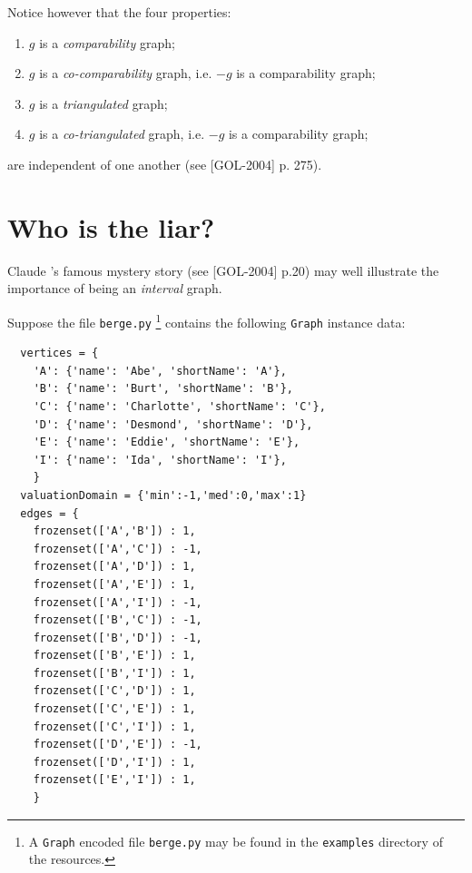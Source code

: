 Notice however that the four properties:
\begin{enumerate}
\item $g$ is a \emph{comparability} graph;
\item $g$ is a \emph{co-comparability} graph, i.e. $-g$ is a comparability graph;
\item $g$ is a \emph{triangulated} graph;
\item $g$ is a \emph{co-triangulated} graph, i.e. $-g$ is a comparability graph;
\end{enumerate}
are independent of one another (see [GOL-2004] p. 275).

\section{Who is the liar?}
\label{sec:25.2}


Claude \Berge's famous mystery story (see [GOL-2004] p.20) may well illustrate the importance of being an \emph{interval} graph.

Suppose the file \texttt{berge.py} \footnote{A \texttt{Graph} encoded file \texttt{berge.py} may be found in the \texttt{examples} directory of the \Digraph resources.} contains the following \texttt{Graph} instance data:
\begin{lstlisting}
  vertices = {
    'A': {'name': 'Abe', 'shortName': 'A'},
    'B': {'name': 'Burt', 'shortName': 'B'},
    'C': {'name': 'Charlotte', 'shortName': 'C'},
    'D': {'name': 'Desmond', 'shortName': 'D'},
    'E': {'name': 'Eddie', 'shortName': 'E'},
    'I': {'name': 'Ida', 'shortName': 'I'},
    }
  valuationDomain = {'min':-1,'med':0,'max':1}
  edges = {
    frozenset(['A','B']) : 1, 
    frozenset(['A','C']) : -1, 
    frozenset(['A','D']) : 1, 
    frozenset(['A','E']) : 1, 
    frozenset(['A','I']) : -1, 
    frozenset(['B','C']) : -1, 
    frozenset(['B','D']) : -1, 
    frozenset(['B','E']) : 1, 
    frozenset(['B','I']) : 1, 
    frozenset(['C','D']) : 1, 
    frozenset(['C','E']) : 1, 
    frozenset(['C','I']) : 1, 
    frozenset(['D','E']) : -1, 
    frozenset(['D','I']) : 1, 
    frozenset(['E','I']) : 1, 
    }
\end{lstlisting}

